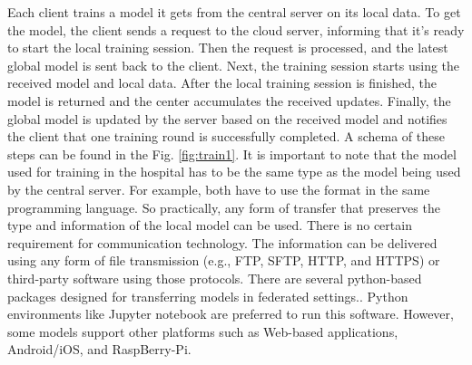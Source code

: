 Each client trains a model it gets from the central server on its local data. To get the model, the client sends a request to the cloud server, informing that it's ready to start the local training session. Then the request is processed, and the latest global model is sent back to the client. Next,  the training session starts using the received model and local data. After the local training session is finished,
the model is returned and the center accumulates the received updates. Finally, the global model is updated by the server based on the received model and notifies the client that one training round is successfully completed.  A schema of these steps can be found in the Fig. \ref{fig:train1}.  It is important to note that the model used for training in the hospital has to be the same type as the model being used by the central server. For example, both have to use the format in the same programming language. So practically, any form of transfer that preserves the type and information of the local model can be used. There is no certain requirement for communication technology. The information can be delivered using any form of file transmission (e.g., FTP, SFTP, HTTP, and HTTPS) or third-party software using those protocols. There are several python-based packages designed for transferring models in federated settings.\cite{he2020fedml}.  Python environments like Jupyter notebook are preferred to run this software. However, some models support other platforms such as Web-based applications, Android/iOS, and RaspBerry-Pi.\cite{beutel2020flower}






